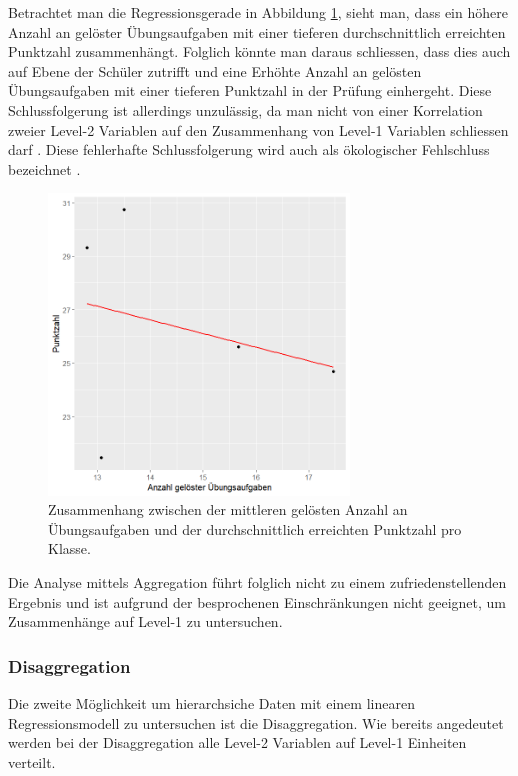 \documentclass[12pt, a4paper]{article}\usepackage[]{graphicx}\usepackage[]{color}
\begin{document}
Betrachtet man die Regressionsgerade in Abbildung \ref{fig:aggregiert}, sieht man, dass ein höhere Anzahl an gelöster Übungsaufgaben mit einer tieferen durchschnittlich erreichten Punktzahl zusammenhängt. Folglich könnte man daraus schliessen, dass dies auch auf Ebene der Schüler zutrifft und eine Erhöhte Anzahl an gelösten Übungsaufgaben mit einer tieferen Punktzahl in der Prüfung einhergeht. Diese Schlussfolgerung ist allerdings unzulässig, da man nicht von einer Korrelation zweier Level-2 Variablen auf den Zusammenhang von Level-1 Variablen schliessen darf \citep{SnijdersTomA.B2012Ma:a}.  Diese fehlerhafte Schlussfolgerung wird auch als ökologischer Fehlschluss bezeichnet \citep{robinson2009ecological}.

\begin{figure}[b!]
\centering
\captionsetup{width=8cm}
\includegraphics[width = 8cm, height = 8cm]{./figures/aggregation}
\caption{Zusammenhang zwischen der mittleren gelösten Anzahl an Übungsaufgaben und der durchschnittlich erreichten Punktzahl pro Klasse.}
\label{fig:aggregiert}
\end{figure}

Die Analyse mittels Aggregation führt folglich nicht zu einem zufriedenstellenden Ergebnis und ist aufgrund der besprochenen Einschränkungen nicht geeignet, um Zusammenhänge auf Level-1 zu untersuchen.

\subsubsection{Disaggregation} \label{section:disaggregation}
Die zweite Möglichkeit um hierarchsiche Daten mit einem linearen Regressionsmodell zu untersuchen ist die Disaggregation. Wie bereits angedeutet werden bei der Disaggregation alle Level-2 Variablen auf Level-1 Einheiten verteilt. 
\end{document}
